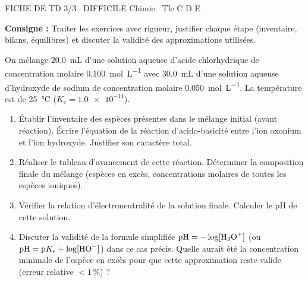 \documentclass[11pt]{article}
\begin{document}
\begin{tcolorbox}[enhanced,colback=popink,colframe=popink,arc=10pt,boxrule=0pt,left=12pt,right=12pt,top=9pt,bottom=9pt]
{\color{white}\popxbold\small FICHE DE TD 3/3 \textbullet\ DIFFICILE \hfill Chimie \textbullet\ Tle C D E\par}
\end{tcolorbox}
\vspace{4pt}
\noindent\textbf{Consigne :} Traiter les exercices avec rigueur, justifier chaque étape (inventaire, bilans, équilibres) et discuter la validité des approximations utilisées.

\begin{exercice}
On mélange \SI{20,0}{\milli\liter} d'une solution aqueuse d'acide chlorhydrique  de concentration molaire \SI{0,100}{\mole\per\liter} avec \SI{30,0}{\milli\liter} d'une solution aqueuse d'hydroxyde de sodium  de concentration molaire \SI{0,050}{\mole\per\liter}. La température est de \SI{25}{\celsius} ($K_\text{e} = \num{1,0e-14}$).
\begin{enumerate}
    \item Établir l'inventaire des espèces présentes dans le mélange initial (avant réaction). Écrire l'équation de la réaction d'acido-basicité entre l'ion oxonium et l'ion hydroxyde. Justifier son caractère total.
    \item Réaliser le tableau d'avancement de cette réaction. Déterminer la composition finale du mélange (espèces en excès, concentrations molaires de toutes les espèces ioniques).
    \item Vérifier la relation d'électroneutralité de la solution finale. Calculer le pH de cette solution.
    \item Discuter la validité de la formule simplifiée $\text{pH} = -\log[\ce{H3O+}]$ (ou $\text{pH} = \text{p}K_\text{e} + \log[\ce{HO-}]$) dans ce cas précis. Quelle aurait été la concentration minimale de l'espèce en excès pour que cette approximation reste valide (erreur relative $< 1\,\%$) ?
\end{enumerate}
\end{exercice}
\end{document}
